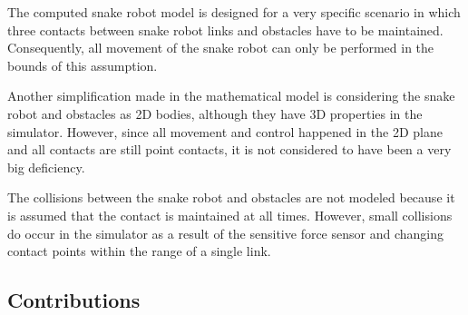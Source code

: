 The computed snake robot model is designed for a very specific scenario in which three contacts between snake robot links and obstacles have to be maintained. Consequently, all movement of the snake robot can only be performed in the bounds of this assumption. 

Another simplification made in the mathematical model is considering the snake robot and obstacles as 2D bodies, although they have 3D properties in the simulator. However, since all movement and control happened in the 2D plane and all contacts are still point contacts, it is not considered to have been a very big deficiency.

The collisions between the snake robot and obstacles are not modeled because it is assumed that the contact is maintained at all times. However, small collisions do occur in the simulator as a result of the sensitive force sensor and changing contact points within the range of a single link.

\subsection{Contributions}

